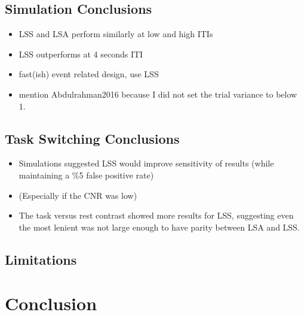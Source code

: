 \documentclass[10pt,letterpaper]{article}
\begin{document}
\subsection*{Simulation Conclusions}

\begin{itemize}
  \item LSS and LSA perform similarly at low and high ITIs
  \item LSS outperforms at 4 seconds ITI
  \item fast(ish) event related design, use LSS
  \item mention Abdulrahman2016 because I did not set the trial variance to below 1.
\end{itemize}

\subsection*{Task Switching Conclusions}
\begin{itemize}
  \item Simulations suggested LSS would improve sensitivity of results (while maintaining a \%5 false positive rate)
  \item (Especially if the CNR was low)
  \item The task versus rest contrast showed more results for LSS,
        suggesting even the most lenient was not large enough
        to have parity between LSA and LSS.
\end{itemize}

\subsection{Limitations}
\section*{Conclusion}

\end{document}
